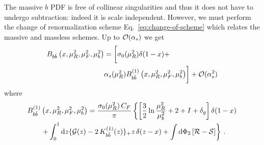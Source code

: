 The massive $b$ PDF is free of collinear singularities and thus it
does
not have to
undergo subtraction: indeed it is scale independent.
However, we must perform the change of
renormalization scheme Eq.~\eqref{eq:change-of-scheme} which relates
the massive and massless schemes.
Up to ${\cal O}(\alpha_s)$ we get
\begin{align}
  B_{b\bar{b}}\left(x,\mu_R^2,\mu_F^2 ,\mu_b^2\right) &= 
  \biggl[ \sigma_0(\mu_R^2) \delta(1-x) + \nonumber \\ &\alpha_s(\mu_R^2)
    B_{b\bar{b}}^{(1)}\left(x,\mu_R^2,\mu_F^2 ,\mu_b^2\right) \biggr]
  +{\cal O}(\alpha_s^2)
\end{align}
where
\begin{equation}
  \begin{split}
  B_{b\bar{b}}^{(1)}&\left(x,\mu_R^2,\mu_F^2 ,\mu_b^2\right) =
  \frac{\sigma_0(\mu_R^2)\,C_F}{\pi}
  \left\{
    \left[
      \frac{3}{2}\ln\frac{\mu_R^2}{\mu_b^2}+2 + I + \delta_g
    \right]\delta(1-x) \right.\\
  &\left.
   + \int_0^1{\rm d}z \{{\cal G}(z) - 2\,K_{b\bar{b}}^{(1)}(z)\}_+z\,\delta(z-x)
   +  \int{\rm d}\Phi_2 \left[{\cal R} -{\cal S}\right] \right\}\,.
  \end{split}
\end{equation}

